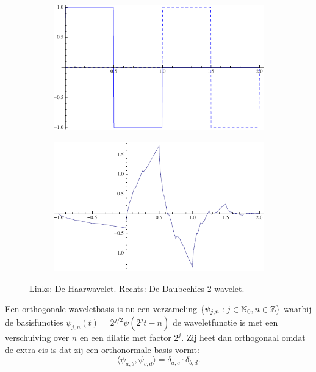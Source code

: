 \begin{figure}[h]
  \centering
  \begin{subfigure}{0.48\linewidth}
    \includegraphics[width=\linewidth]{plaatjes/db1.pdf}
  \end{subfigure}
  \begin{subfigure}{0.48\linewidth}
    \includegraphics[width=\linewidth]{plaatjes/db2_psi.pdf}
  \end{subfigure}
  \caption{Links: De Haarwavelet. Rechts: De Daubechies-2 wavelet.}
\label{fig:samenv}
\end{figure}

Een orthogonale waveletbasis is nu een verzameling $\{ \psi_{j,n}: j \in \mathbb{N}_0, n \in \mathbb{Z} \}$ waarbij de basisfuncties \mbox{$\psi_{j,n}(t) = 2^{j/2} \psi(2^jt - n)$} de waveletfunctie is met een verschuiving over $n$ en een dilatie met factor $2^j$. Zij heet dan orthogonaal omdat de extra eis is dat zij een orthonormale basis vormt: \[\langle \psi_{a,b}, \psi_{c,d} \rangle = \delta_{a,c} \cdot \delta_{b,d}.\]

